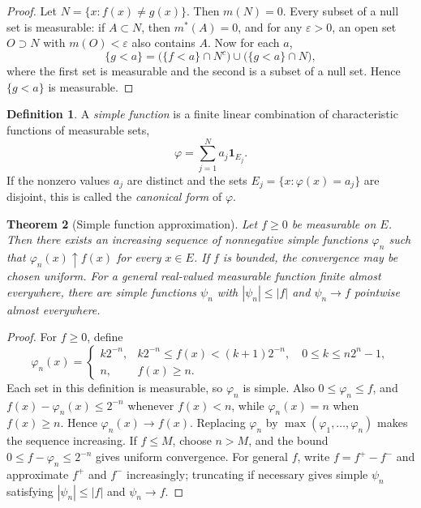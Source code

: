 \documentclass[11pt,openany]{book}
\numberwithin{equation}{chapter}
\theoremstyle{definition}
\newtheorem{definition}{Definition}[chapter]
\theoremstyle{plain}
\newtheorem{theorem}[definition]{Theorem}
\theoremstyle{remark}
\newcommand{\eps}{\varepsilon}
\newcommand{\1}{\mathbf{1}}
\newcommand{\abs}[1]{\left\lvert #1\right\rvert}
\begin{document}
\begin{proof}
Let \(N=\{x:f(x)\ne g(x)\}\).  Then \(m(N)=0\).  Every subset of a null set is measurable: if \(A\subset N\), then \(m^*(A)=0\), and for any \(\eps>0\), an open set \(O\supset N\) with \(m(O)<\eps\) also contains \(A\).  Now for each \(a\),
\[
    \{g<a\}=\bigl(\{f<a\}\cap N^c\bigr)\cup\bigl(\{g<a\}\cap N\bigr),
\]
where the first set is measurable and the second is a subset of a null set.  Hence \(\{g<a\}\) is measurable.
\end{proof}

\begin{definition}
A \emph{simple function} is a finite linear combination of characteristic functions of measurable sets,
\[
    \varphi=\sum_{j=1}^N a_j\1_{E_j}.
\]
If the nonzero values \(a_j\) are distinct and the sets \(E_j=\{x:\varphi(x)=a_j\}\) are disjoint, this is called the \emph{canonical form} of \(\varphi\).
\end{definition}

\begin{theorem}[Simple function approximation]
Let \(f\ge0\) be measurable on \(E\).  Then there exists an increasing sequence of nonnegative simple functions \(\varphi_n\) such that \(\varphi_n(x)\uparrow f(x)\) for every \(x\in E\).  If \(f\) is bounded, the convergence may be chosen uniform.  For a general real-valued measurable function finite almost everywhere, there are simple functions \(\psi_n\) with \(\abs{\psi_n}\le\abs f\) and \(\psi_n\to f\) pointwise almost everywhere.
\end{theorem}

\begin{proof}
For \(f\ge0\), define
\[
    \varphi_n(x)=
    \begin{cases}
    k2^{-n}, & k2^{-n}\le f(x)<(k+1)2^{-n},\quad 0\le k\le n2^n-1,\\
    n, & f(x)\ge n.
    \end{cases}
\]
Each set in this definition is measurable, so \(\varphi_n\) is simple.  Also \(0\le\varphi_n\le f\), and \(f(x)-\varphi_n(x)\le2^{-n}\) whenever \(f(x)<n\), while \(\varphi_n(x)=n\) when \(f(x)\ge n\).  Hence \(\varphi_n(x)\to f(x)\).  Replacing \(\varphi_n\) by \(\max(\varphi_1,\ldots,\varphi_n)\) makes the sequence increasing.  If \(f\le M\), choose \(n>M\), and the bound \(0\le f-\varphi_n\le2^{-n}\) gives uniform convergence.  For general \(f\), write \(f=f^+-f^-\) and approximate \(f^+\) and \(f^-\) increasingly; truncating if necessary gives simple \(\psi_n\) satisfying \(\abs{\psi_n}\le\abs f\) and \(\psi_n\to f\).
\end{proof}
\end{document}
